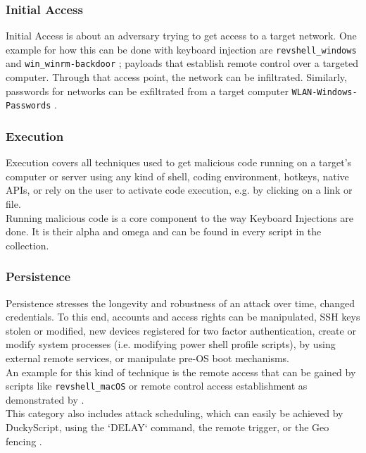 \subsubsection{Initial Access}

Initial Access is about an adversary trying to get access to a target network\cite{MITREATTCK}. One example for how this can be done with keyboard injection are \verb|revshell_windows| and \verb|win_winrm-backdoor| \cite{OmgpayloadsPayloadsLibrary}; payloads that establish remote control over a targeted computer. Through that access point, the network can be infiltrated. Similarly, passwords for networks can be exfiltrated from a target computer \verb|WLAN-Windows-Passwords| \cite{OmgpayloadsPayloadsLibrary}.\\

\subsubsection{Execution}

Execution covers all techniques used to get malicious code running on a target's computer or server using any kind of shell, coding environment, hotkeys, native APIs, or rely on the user to activate code execution, e.g. by clicking on a link or file.\cite{MITREATTCK}\\
Running malicious code is a core component to the way Keyboard Injections are done. It is their alpha and omega and can be found in every script in the collection.

\subsubsection{Persistence} \label{persistence}

Persistence stresses the longevity and robustness of an attack over time, changed credentials. To this end, accounts and access rights can be manipulated, SSH keys stolen or modified, new devices registered for two factor authentication, create or modify system processes (i.e. modifying power shell profile scripts), by using external remote services, or manipulate pre-OS boot mechanisms.\cite{MITREATTCK} \\
An example for this kind of technique is the remote access that can be gained by scripts like \verb|revshell_macOS| \cite{OmgpayloadsPayloadsLibrary} or remote control access establishment as demonstrated by \cite{bojovicRisingThreatHardware2019}. \\
This category also includes attack scheduling, which can easily be achieved by DuckyScript, using the `DELAY` command, the remote trigger, or the Geo fencing \cite{hak5MGCable}.

